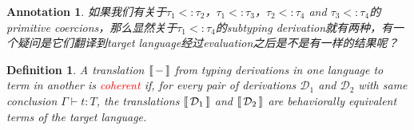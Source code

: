 \documentclass{article}
\theoremstyle{plain}
\newtheorem{definition}[theorem]{Definition}
\newtheorem{annotation}[theorem]{Annotation}
\theoremstyle{nonumberplain}
\newcommand{\termtype}[2]{\ensuremath{#1:#2}}
\newcommand{\redt}[1]{\textcolor{red}{#1}}
\newcommand{\dbracket}[1]{\ensuremath{\left\llbracket\,\vcenter{\hbox{$#1$}}\,\right\rrbracket}}
\begin{document}
\begin{annotation}
\rm 如果我们有关于$\tau_1<:\tau_2$，$\tau_1 <: \tau_3$，$\tau_2<:\tau_4$ and $\tau_3<:\tau_4$的primitive coercions，那么显然关于$\tau_1 <: \tau_4$的subtyping derivation就有两种，有一个疑问是它们翻译到target language经过evaluation之后是不是有一样的结果呢？
\end{annotation}


\begin{definition}
\rm A translation $\dbracket{-}$ from typing derivations in one language to term in another is \redt{coherent} if, for every pair of derivations $\mathcal{D}_1$ and $\mathcal{D}_2$ with same conclusion $\Gamma \vdash \termtype{t}{T}$, the translations $\dbracket{\mathcal{D}_1}$ and $\dbracket{\mathcal{D}_2}$ are behaviorally equivalent terms of the target language.
\end{definition}
\end{document}
